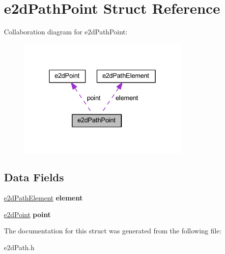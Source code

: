 \hypertarget{structe2dPathPoint}{\section{e2d\-Path\-Point Struct Reference}
\label{structe2dPathPoint}
}


Collaboration diagram for e2d\-Path\-Point\-:\nopagebreak
\begin{figure}[H]
\begin{center}
\leavevmode
\includegraphics[width=241pt]{structe2dPathPoint__coll__graph}
\end{center}
\end{figure}
\subsection*{Data Fields}
\begin{DoxyCompactItemize}
\item 
\hypertarget{structe2dPathPoint_a88e514266530010a1a3b08198b3cc763}{\hyperlink{structe2dPathElement}{e2d\-Path\-Element} {\bfseries element}}\label{structe2dPathPoint_a88e514266530010a1a3b08198b3cc763}

\item 
\hypertarget{structe2dPathPoint_afff60c971a4d4728af80b4753d30c5bf}{\hyperlink{structe2dPoint}{e2d\-Point} {\bfseries point}}\label{structe2dPathPoint_afff60c971a4d4728af80b4753d30c5bf}

\end{DoxyCompactItemize}


The documentation for this struct was generated from the following file\-:\begin{DoxyCompactItemize}
\item 
e2d\-Path.\-h\end{DoxyCompactItemize}
